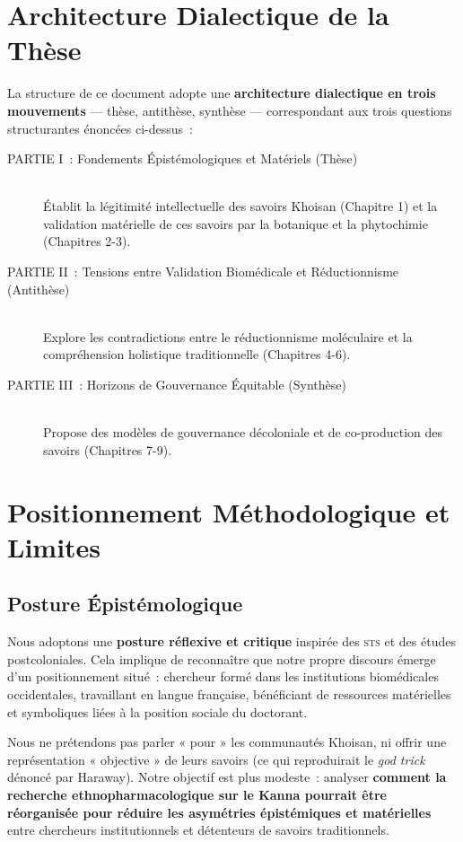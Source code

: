 \documentclass[12pt,a4paper,twoside]{book}
\begin{document}
\section{Architecture Dialectique de la Thèse}

La structure de ce document adopte une \textbf{architecture dialectique en trois mouvements} --- thèse, antithèse, synthèse --- correspondant aux trois questions structurantes énoncées ci-dessus~:

\begin{description}
\item[PARTIE I~: Fondements Épistémologiques et Matériels (Thèse)] \hfill \\
Établit la légitimité intellectuelle des savoirs Khoisan (Chapitre 1) et la validation matérielle de ces savoirs par la botanique et la phytochimie (Chapitres 2-3).

\item[PARTIE II~: Tensions entre Validation Biomédicale et Réductionnisme (Antithèse)] \hfill \\
Explore les contradictions entre le réductionnisme moléculaire et la compréhension holistique traditionnelle (Chapitres 4-6).

\item[PARTIE III~: Horizons de Gouvernance Équitable (Synthèse)] \hfill \\
Propose des modèles de gouvernance décoloniale et de co-production des savoirs (Chapitres 7-9).
\end{description}

\section{Positionnement Méthodologique et Limites}

\subsection{Posture Épistémologique}

Nous adoptons une \textbf{posture réflexive et critique} inspirée des \textsc{sts} et des études postcoloniales. Cela implique de reconnaître que notre propre discours émerge d'un positionnement situé~: chercheur formé dans les institutions biomédicales occidentales, travaillant en langue française, bénéficiant de ressources matérielles et symboliques liées à la position sociale du doctorant.

Nous ne prétendons pas parler « pour » les communautés Khoisan, ni offrir une représentation « objective » de leurs savoirs (ce qui reproduirait le \textit{god trick} dénoncé par Haraway). Notre objectif est plus modeste~: analyser \textbf{comment la recherche ethnopharmacologique sur le Kanna pourrait être réorganisée pour réduire les asymétries épistémiques et matérielles} entre chercheurs institutionnels et détenteurs de savoirs traditionnels.
\end{document}
